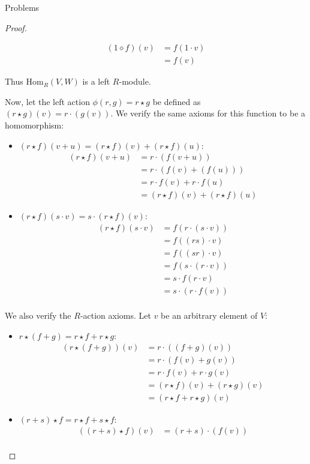 \documentclass[12pt]{article}
\theoremstyle{definition}
\begin{document}
\begin{section}{Problems}
\begin{proof}
\begin{itemize}
\begin{align*}
					(1 \diamond f)(v) &= f(1 \cdot  v)\\
					&= f(v)
				\end{align*}
		\end{itemize}
		Thus $\text{Hom}_R(V,W)$ is a left $R$-module.
		\par Now, let the left action $\phi(r, g) = r \star g$ be defined as $(r \star g)(v) = r \cdot (g(v))$. We verify the same axioms for this function to be a homomorphism:
		\begin{itemize}
			\item $(r \star f)(v + u) = (r \star f)(v) + (r \star f)(u)$:
				\begin{align*}
					(r \star f)(v + u) &= r \cdot (f(v + u))\\
					&= r \cdot (f(v) + (f(u)))\\
					&= r \cdot f(v) + r \cdot f(u)\\
					&= (r \star f)(v) + (r \star f)(u)
				\end{align*}
			\item $(r \star f)(s \cdot v) = s \cdot (r \star f)(v)$:
				\begin{align*}
					(r \star f)(s \cdot v) &= f(r \cdot (s \cdot v))\\
					&= f( (rs) \cdot v)\\
					&= f( (sr) \cdot v)\\
					&= f(s \cdot (r \cdot v))\\
					&= s \cdot f(r \cdot v)\\
					&= s \cdot (r \cdot f(v))\\
				\end{align*}
		\end{itemize}
		We also verify the $R$-action axioms. Let $v$ be an arbitrary element of $V$:
		\begin{itemize}
			\item $r  \star (f+g) = r \star f + r\star g$:
				\begin{align*}
					(r \star (f+g))(v) &= r \cdot ((f+g)(v))\\
					&= r \cdot (f(v) + g(v))\\
					&= r\cdot f(v) + r\cdot g(v)\\
					&= (r \star f)(v) + (r \star g)(v)\\
					&= (r \star f + r \star g)(v)
				\end{align*}
			\item $(r + s) \star f = r \star f + s \star f$:
				\begin{align*}
					((r + s) \star f)(v) &= (r + s) \cdot (f(v))\\

\end{align*}
\end{itemize}
\end{proof}
\end{section}
\end{document}
